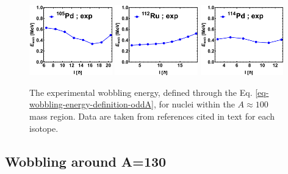 \begin{figure}
    \centering
    \includegraphics[width=0.32\textwidth]{Chapters/Figures/wobblers/105Pd.pdf}
    \includegraphics[width=0.32\textwidth]{Chapters/Figures/wobblers/112Ru.pdf}
    \includegraphics[width=0.32\textwidth]{Chapters/Figures/wobblers/114Pd.pdf}
    \caption{The experimental wobbling energy, defined through the Eq. \ref{eq-wobbling-energy-definition-oddA}, for nuclei within the $A\approx 100$ mass region. Data are taken from references cited in text for each isotope.}
    \label{wobblers-exp-set1}
\end{figure}

\subsection{Wobbling around A=130}

